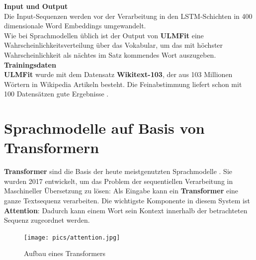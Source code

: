 \textbf{Input und Output}\\
Die Input-Sequenzen werden vor der Verarbeitung in den LSTM-Schichten in 400 dimensionale Word Embeddings umgewandelt.\\
Wie bei Sprachmodellen \"ublich ist der Output von \textbf{ULMFit} eine Wahrscheinlichkeitsverteilung \"uber das Vokabular, um das mit h\"ochster Wahrscheinlichkeit als n\"achtes im Satz kommendes Wort auszugeben.\\

\textbf{Trainingsdaten}\\
\textbf{ULMFit} wurde mit dem Datensatz \textbf{Wikitext-103}, der aus 103 Millionen W\"ortern in Wikipedia Artikeln besteht. Die Feinabstimmung liefert schon mit 100 Datens\"atzen gute Ergebnisse \cite{ulm}.



\section{Sprachmodelle auf Basis von Transformern}
\textbf{Transformer} sind die Basis der heute meistgenutzten Sprachmodelle \cite{bert}\cite{gpt}. Sie wurden 2017 entwickelt, um das Problem der sequentiellen Verarbeitung in Maschineller \"Ubersetzung zu l\"osen: Als Eingabe kann ein \textbf{Transformer} eine ganze Textsequenz verarbeiten. Die wichtigste Komponente in diesem System ist \textbf{Attention}: Dadurch kann einem Wort sein Kontext innerhalb der betrachteten Sequenz zugeordnet werden.\\
\begin{figure}[!ht]
\centering
\texttt{[image: pics/attention.jpg]}
\caption{Aufbau eines Transformers \cite{attention}}
\label{fig:attention}
\end{figure}

